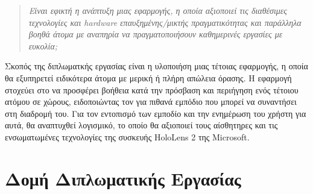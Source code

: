 \begin{quote}
    \textit{Είναι εφικτή η ανάπτυξη μιας εφαρμογής, η οποία  αξιοποιεί τις διαθέσιμες τεχνολογίες και hardware επαυξημένης/μικτής πραγματικότητας και παράλληλα βοηθά άτομα με αναπηρία να πραγματοποιήσουν καθημερινές εργασίες με ευκολία;}
\end{quote}
Σκοπός της διπλωματκής εργασίας είναι η υλοποιήση μιας τέτοιας εφαρμογής, η οποία θα εξυπηρετεί ειδικότερα άτομα με μερική ή πλήρη απώλεια όρασης. Η εφαρμογή στοχεύει στο να προσφέρει βοήθεια κατά την πρόσβαση και περιήγηση ενός τέτοιου ατόμου σε χώρους, ειδοποιώντας τον για πιθανά εμπόδιο που μπορεί να συναντήσει στη διαδρομή του. Για τον εντοπισμό των εμποδίο και την ενημέρωση του χρήστη για αυτά, θα αναπτυχθεί λογισμικό, το οποίο θα αξιοποιεί τους αίσθητηρες και τις ενσωματωμένες τεχνολογίες της συσκευής HoloLens 2 της Microsoft.

\section{Δομή Διπλωματικής Εργασίας}
